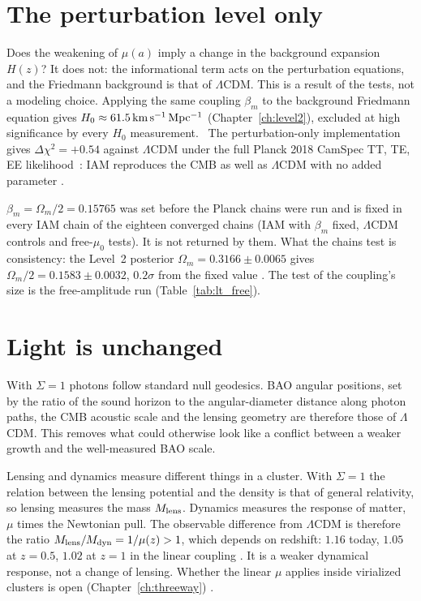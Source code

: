 \section{The perturbation level only}\label{sec:s8_perturbation}
Does the weakening of $\mu(a)$ imply a change in the background expansion $H(z)$? It does not: the informational term acts on the perturbation
equations, and the Friedmann background is that of $\Lambda$CDM. This is a result of the tests, not a modeling choice. Applying the same coupling
$\beta_m$ to the background Friedmann equation gives $H_0\approx61.5\,{\rm km\,s^{-1}\,Mpc^{-1}}$ (Chapter~\ref{ch:level2}), excluded at high
significance by every $H_0$ measurement. \measured\ The perturbation-only implementation gives $\Delta\chi^2=+0.54$ against $\Lambda$CDM under the full
Planck 2018 CamSpec TT, TE, EE likelihood~\cite{Planck2018VI}: IAM reproduces the CMB as well as $\Lambda$CDM with no added parameter \measured.

$\beta_m=\Omega_m/2=0.15765$ was set before the Planck chains were run and is fixed in every IAM chain of the eighteen converged chains (IAM with $\beta_m$ fixed, $\Lambda$CDM controls and free-$\mu_0$ tests). It is not returned by
them. What the chains test is consistency: the Level~2 posterior $\Omega_m=0.3166\pm0.0065$ gives $\Omega_m/2=0.1583\pm0.0032$, $0.2\sigma$ from the
fixed value \calc. The test of the coupling's size is the free-amplitude run (Table~\ref{tab:lt_free}).

\section{Light is unchanged}
With $\Sigma=1$ photons follow standard null geodesics. BAO angular positions, set by the ratio of the sound horizon to the angular-diameter distance
along photon paths, the CMB acoustic scale and the lensing geometry are therefore those of $\Lambda$CDM. This removes what could otherwise look like a
conflict between a weaker growth and the well-measured BAO scale. \prediction

Lensing and dynamics measure different things in a cluster. With $\Sigma=1$ the relation between the lensing potential and the density is that of
general relativity, so lensing measures the mass $M_{\rm lens}$. Dynamics measures the response of matter, $\mu$ times the Newtonian pull. The
observable difference from $\Lambda$CDM is therefore the ratio $M_{\rm lens}/M_{\rm dyn}=1/\mu(z)>1$, which depends on redshift: $1.16$ today, $1.05$ at
$z=0.5$, $1.02$ at $z=1$ in the linear coupling \calc. It is a weaker dynamical response, not a change of lensing. Whether the linear $\mu$ applies
inside virialized clusters is open (Chapter~\ref{ch:threeway}) \openprob.

